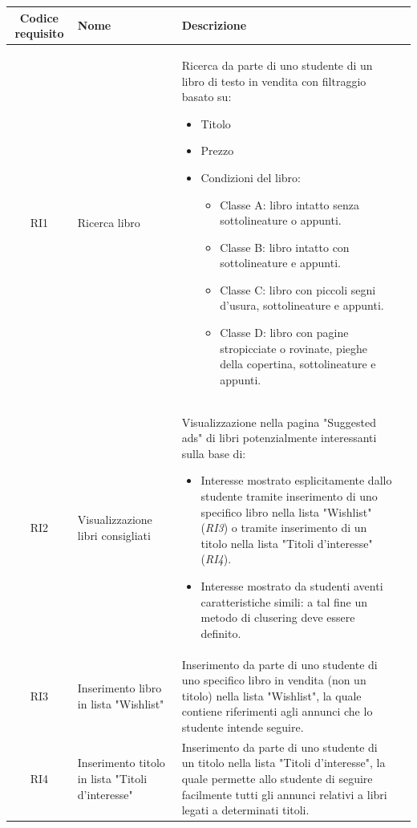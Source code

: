 \documentclass[10pt,a4paper]{article}
\begin{document}
	\begin{tabular}{cp{3cm}p{9cm}p{1cm}}
		Codice requisito&Nome&Descrizione\\ \hline
		RI1&Ricerca libro&Ricerca da parte di uno studente di un libro di testo in vendita con filtraggio basato su:
		\begin{itemize}
			\item Titolo
			\item Prezzo
			\item Condizioni del libro:
			\begin{itemize}
				\item Classe A: libro intatto senza sottolineature o appunti.
				\item Classe B: libro intatto con sottolineature e appunti.
				\item Classe C: libro con piccoli segni d'usura, sottolineature e appunti.
				\item Classe D: libro con pagine stropicciate o rovinate, pieghe della copertina, sottolineature e appunti.
			\end{itemize}
			
		\end{itemize}\\ \hline
		RI2&Visualizzazione libri consigliati&Visualizzazione nella pagina "Suggested ads" di libri potenzialmente interessanti sulla base di:
		\begin{itemize}
			\item Interesse mostrato esplicitamente dallo studente tramite inserimento di uno specifico libro nella lista "Wishlist" (\textit{RI3}) o tramite inserimento di un titolo nella lista "Titoli d'interesse" (\textit{RI4}).
			\item Interesse mostrato da studenti aventi caratteristiche simili: a tal fine un metodo di clusering deve essere definito.
		\end{itemize}\\ \hline
		RI3&Inserimento libro in lista "Wishlist"&Inserimento da parte di uno studente di uno specifico libro in vendita (non un titolo) nella lista "Wishlist", la quale contiene riferimenti agli annunci che lo studente intende seguire.\\ \hline
		RI4&Inserimento titolo in lista "Titoli d'interesse"&Inserimento da parte di uno studente di un titolo nella lista "Titoli d'interesse", la quale permette allo studente di seguire facilmente tutti gli annunci relativi a libri legati a determinati titoli.\\ \hline
	\end{tabular}
\end{document}
